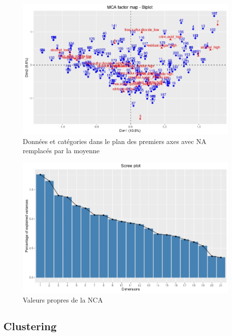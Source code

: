\documentclass[11pt,a4paper]{article}
\begin{document}
\begin{figure}

\includegraphics[width=\textwidth,keepaspectratio]{"biplot-nona"}

\caption{Données et catégories dans le plan des premiers axes avec NA remplacés par la moyenne}
\label{fig:biplot}
\end{figure}


\begin{figure}

\includegraphics[width=\textwidth,keepaspectratio]{"mca-eigen"}

\caption{Valeurs propres de la NCA}
\label{fig:screeplot}
\end{figure}

\FloatBarrier


\subsection{Clustering}
\end{document}
